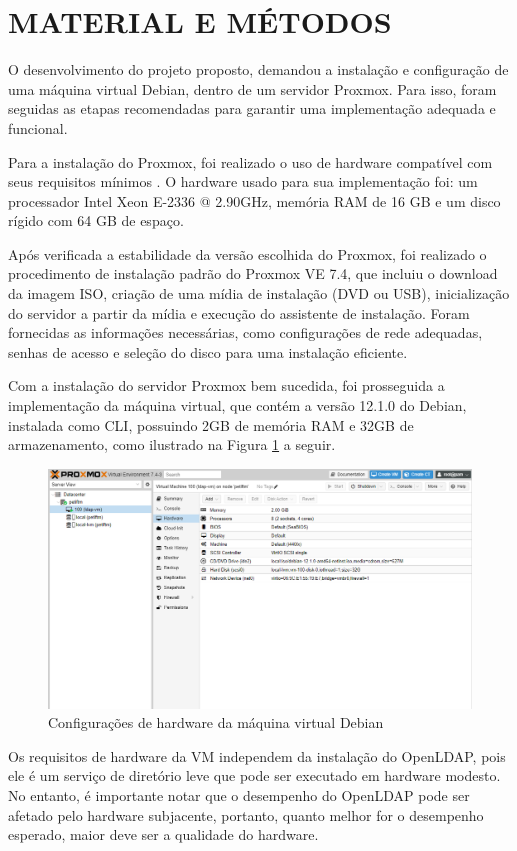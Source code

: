 \section{MATERIAL E MÉTODOS}

O desenvolvimento do projeto proposto, demandou a instalação e configuração de uma máquina virtual Debian, dentro de um servidor Proxmox. Para isso, foram seguidas as etapas recomendadas para garantir uma implementação adequada e funcional.

Para a instalação do Proxmox, foi realizado o uso de hardware compatível com seus requisitos mínimos \cite{proxmox-requirements}. O hardware usado para sua implementação foi: um processador Intel Xeon E-2336 @ 2.90GHz, memória RAM de 16 GB e um disco rígido com 64 GB de espaço.

Após verificada a estabilidade da versão escolhida do Proxmox, foi realizado o procedimento de instalação padrão do Proxmox VE 7.4, que incluiu o download da imagem ISO, criação de uma mídia de instalação (DVD ou USB), inicialização do servidor a partir da mídia e execução do assistente de instalação. Foram fornecidas as informações necessárias, como configurações de rede adequadas, senhas de acesso e seleção do disco para uma instalação eficiente.

Com a instalação do servidor Proxmox bem sucedida, foi prosseguida a implementação da máquina virtual, que contém a versão 12.1.0 do Debian, instalada como CLI, possuindo 2GB de memória RAM e 32GB de armazenamento, como ilustrado na Figura \ref{fig:hardwareDebian} a seguir.

\begin{figure}[h]
    \centering
	\includegraphics[scale=0.4]{textuais/VMconfigs2.png}
	\caption{Configurações de hardware da máquina virtual Debian}
	\label{fig:hardwareDebian}
\end{figure}

Os requisitos de hardware da VM independem da instalação do OpenLDAP, pois ele é um serviço de diretório leve que pode ser executado em hardware modesto. No entanto, é importante notar que o desempenho do OpenLDAP pode ser afetado pelo hardware subjacente, portanto, quanto melhor for o desempenho esperado, maior deve ser a qualidade do hardware.

